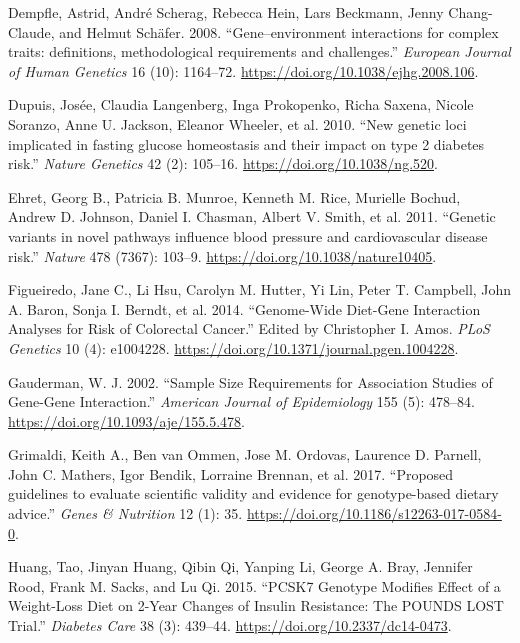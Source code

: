 \documentclass[]{article}
\begin{document}
\leavevmode\hypertarget{ref-Dempfle2008}{}%
Dempfle, Astrid, André Scherag, Rebecca Hein, Lars Beckmann, Jenny
Chang-Claude, and Helmut Schäfer. 2008. ``Gene--environment interactions
for complex traits: definitions, methodological requirements and
challenges.'' \emph{European Journal of Human Genetics} 16 (10):
1164--72. \url{https://doi.org/10.1038/ejhg.2008.106}.

\leavevmode\hypertarget{ref-Dupuis2010}{}%
Dupuis, Josée, Claudia Langenberg, Inga Prokopenko, Richa Saxena, Nicole
Soranzo, Anne U. Jackson, Eleanor Wheeler, et al. 2010. ``New genetic
loci implicated in fasting glucose homeostasis and their impact on type
2 diabetes risk.'' \emph{Nature Genetics} 42 (2): 105--16.
\url{https://doi.org/10.1038/ng.520}.

\leavevmode\hypertarget{ref-Ehret2011}{}%
Ehret, Georg B., Patricia B. Munroe, Kenneth M. Rice, Murielle Bochud,
Andrew D. Johnson, Daniel I. Chasman, Albert V. Smith, et al. 2011.
``Genetic variants in novel pathways influence blood pressure and
cardiovascular disease risk.'' \emph{Nature} 478 (7367): 103--9.
\url{https://doi.org/10.1038/nature10405}.

\leavevmode\hypertarget{ref-Figueiredo2014}{}%
Figueiredo, Jane C., Li Hsu, Carolyn M. Hutter, Yi Lin, Peter T.
Campbell, John A. Baron, Sonja I. Berndt, et al. 2014. ``Genome-Wide
Diet-Gene Interaction Analyses for Risk of Colorectal Cancer.'' Edited
by Christopher I. Amos. \emph{PLoS Genetics} 10 (4): e1004228.
\url{https://doi.org/10.1371/journal.pgen.1004228}.

\leavevmode\hypertarget{ref-Gauderman2002}{}%
Gauderman, W. J. 2002. ``Sample Size Requirements for Association
Studies of Gene-Gene Interaction.'' \emph{American Journal of
Epidemiology} 155 (5): 478--84.
\url{https://doi.org/10.1093/aje/155.5.478}.

\leavevmode\hypertarget{ref-Grimaldi2017}{}%
Grimaldi, Keith A., Ben van Ommen, Jose M. Ordovas, Laurence D. Parnell,
John C. Mathers, Igor Bendik, Lorraine Brennan, et al. 2017. ``Proposed
guidelines to evaluate scientific validity and evidence for
genotype-based dietary advice.'' \emph{Genes \& Nutrition} 12 (1): 35.
\url{https://doi.org/10.1186/s12263-017-0584-0}.

\leavevmode\hypertarget{ref-Huang2015}{}%
Huang, Tao, Jinyan Huang, Qibin Qi, Yanping Li, George A. Bray, Jennifer
Rood, Frank M. Sacks, and Lu Qi. 2015. ``PCSK7 Genotype Modifies Effect
of a Weight-Loss Diet on 2-Year Changes of Insulin Resistance: The
POUNDS LOST Trial.'' \emph{Diabetes Care} 38 (3): 439--44.
\url{https://doi.org/10.2337/dc14-0473}.
\end{document}
